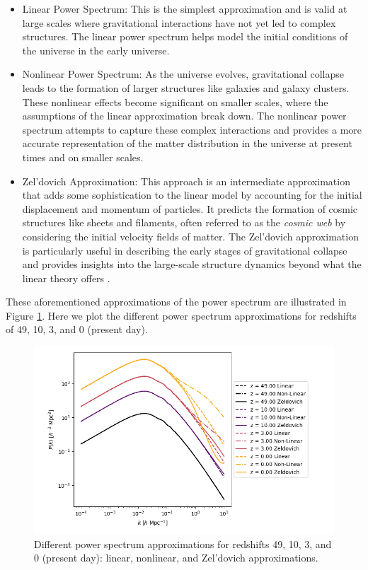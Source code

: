 \documentclass{article}
\begin{document}
\begin{itemize}
    \item Linear Power Spectrum: This is the simplest approximation and is valid at large scales where gravitational interactions have not yet led to complex structures. The linear power spectrum helps model the initial conditions of the universe in the early universe.
    \item Nonlinear Power Spectrum: As the universe evolves, gravitational collapse leads to the formation of larger structures like galaxies and galaxy clusters. These nonlinear effects become significant on smaller scales, where the assumptions of the linear approximation break down. The nonlinear power spectrum attempts to capture these complex interactions and provides a more accurate representation of the matter distribution in the universe at present times and on smaller scales.
    \item Zel'dovich Approximation: This approach is an intermediate approximation that adds some sophistication to the linear model by accounting for the initial displacement and momentum of particles. It predicts the formation of cosmic structures like sheets and filaments, often referred to as the \textit{cosmic web} by considering the initial velocity fields of matter. The Zel'dovich approximation is particularly useful in describing the early stages of gravitational collapse and provides insights into the large-scale structure dynamics beyond what the linear theory offers \citep{schneider1995power}.
\end{itemize}


These aforementioned approximations of the power spectrum are illustrated in Figure \ref{fig:power-z}. Here we plot the different power spectrum approximations for redshifts of 49, 10, 3, and 0 (present day).

\begin{figure}[h]
    \centering
    \includegraphics[width=0.75\linewidth]{img/power_spectrum.png}
    \caption{Different power spectrum approximations for redshifts 49, 10, 3, and 0 (present day): linear, nonlinear, and Zel'dovich approximations.}
    \label{fig:power-z}
\end{figure}
\end{document}
